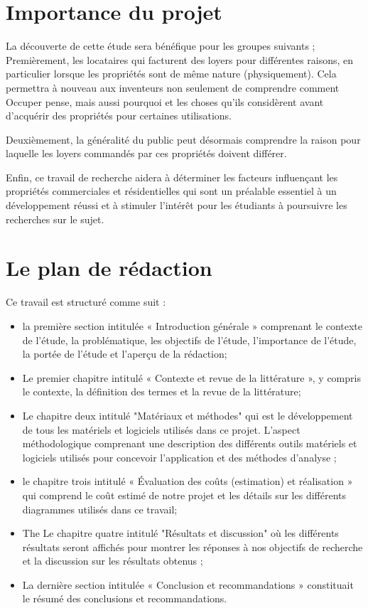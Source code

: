 \documentclass[english,12pt,a4paper]{report}
\begin{document}
\section{Importance du projet }
La découverte de cette étude sera bénéfique pour les groupes suivants ; Premièrement, les locataires qui facturent des loyers pour différentes raisons, en particulier lorsque les propriétés sont de même nature (physiquement). Cela permettra à nouveau aux inventeurs non seulement de comprendre comment Occuper pense, mais aussi pourquoi et les choses qu'ils considèrent avant d'acquérir des propriétés pour certaines utilisations.

 Deuxièmement, la généralité du public peut désormais comprendre la raison pour laquelle les loyers commandés par ces propriétés doivent différer. 
 
 Enfin, ce travail de recherche aidera à déterminer les facteurs influençant les propriétés commerciales et résidentielles qui sont un préalable essentiel à un développement réussi et à stimuler l'intérêt pour les étudiants à poursuivre les recherches sur le sujet.


\section{Le plan de rédaction }

Ce travail est structuré comme suit :

\begin{itemize}
	\item 	la première section intitulée « Introduction générale » comprenant le contexte de l'étude, la problématique, les objectifs de l'étude, l'importance de l'étude, la portée de l'étude et l'aperçu de la rédaction; 
	\item 	 Le premier chapitre intitulé « Contexte et revue de la littérature », y compris le contexte, la définition des termes et la revue de la littérature; 
	\item 	 Le chapitre deux intitulé "Matériaux et méthodes" qui est le développement de tous les matériels et logiciels utilisés dans ce projet. L'aspect méthodologique comprenant une description des différents outils matériels et logiciels utilisés pour concevoir l'application et des méthodes d'analyse ; 
	\item 	le chapitre trois intitulé « Évaluation des coûts (estimation) et réalisation » qui comprend le coût estimé de notre projet et les détails sur les différents diagrammes utilisés dans ce travail; 
	\item The  Le chapitre quatre intitulé "Résultats et discussion" où les différents résultats seront affichés pour montrer les réponses à nos objectifs de recherche et la discussion sur les résultats obtenus ; 
	\item  La dernière section intitulée « Conclusion et recommandations » constituait le résumé des conclusions et recommandations. 
\end{itemize}
\end{document}
